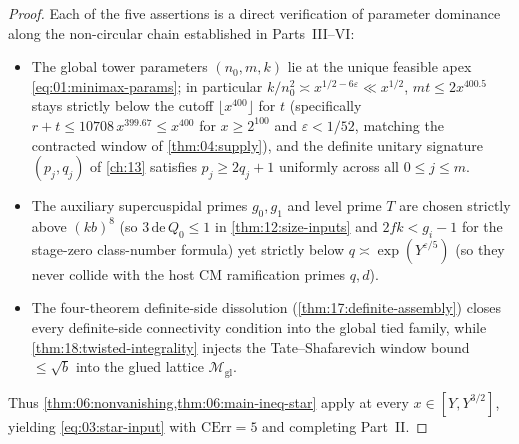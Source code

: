 \begin{proof}
Each of the five assertions is a direct verification of parameter dominance along the non-circular chain established in Parts~III--VI:
\begin{itemize}
\item The global tower parameters $(n_0, m, k)$ lie at the unique feasible apex \eqref{eq:01:minimax-params}; in particular $k / n_0^2 \asymp x^{1/2 - 6\varepsilon} \ll x^{1/2}$, $m t \le 2 x^{400.5}$ stays strictly below the cutoff $\lfloor x^{400}\rfloor$ for $t$ (specifically $r + t \le 10708\, x^{399.67} \le x^{400}$ for $x \ge 2^{100}$ and $\varepsilon < 1/52$, matching the contracted window of \cref{thm:04:supply}), and the definite unitary signature $(p_j, q_j)$ of \cref{ch:13} satisfies $p_j \ge 2 q_j + 1$ uniformly across all $0 \le j \le m$.
\item The auxiliary supercuspidal primes $g_0, g_1$ and level prime $T$ are chosen strictly above $(k b)^8$ (so $3\,\mathrm{de}\,Q_0 \le 1$ in \cref{thm:12:size-inputs} and $2fk < g_i - 1$ for the stage-zero class-number formula) yet strictly below $q \asymp \exp(Y^{\varepsilon/5})$ (so they never collide with the host CM ramification primes $q, d$).
\item The four-theorem definite-side dissolution (\cref{thm:17:definite-assembly}) closes every definite-side connectivity condition into the global tied family, while \cref{thm:18:twisted-integrality} injects the Tate--Shafarevich window bound $\le \sqrt{b}$ into the glued lattice $\mathcal{M}_{\mathrm{gl}}$.
\end{itemize}
Thus \cref{thm:06:nonvanishing,thm:06:main-ineq-star} apply at every $x \in [Y, Y^{3/2}]$, yielding \eqref{eq:03:star-input} with $\mathrm{CErr} = 5$ and completing Part~II.
\end{proof}
